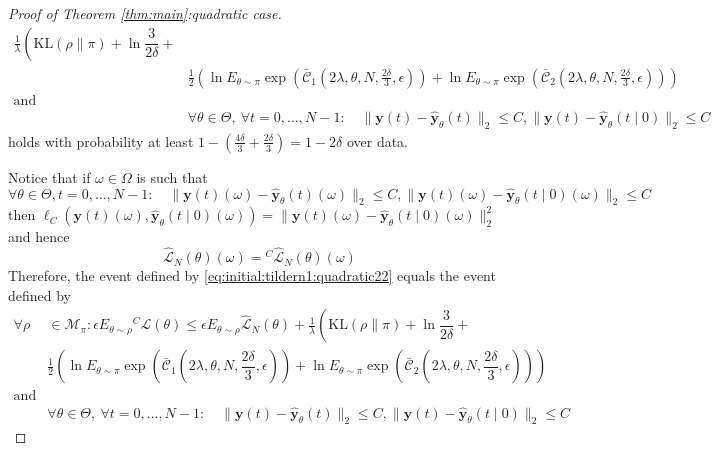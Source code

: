 \documentclass{article}
\newcommand{\KL}{\mathrm{KL}}
\renewcommand{\KL}{\mathrm{KL}}
\newcommand{\y}{\mathbf{y}}
\begin{document}
\begin{proof}[Proof of Theorem \ref{thm:main}:quadratic case]
\begin{equation}
\begin{aligned}
          \frac{1}{\lambda}\left ( \KL(\rho\|\pi) + \ln\dfrac{3}{2\delta} + \right. \\
          &  \left. \frac{1}{2} 
          \left(\ln E_{\theta\sim\pi} \exp(\mathcal{\bar{C}}_1(2\lambda,\theta,N,\frac{2\delta}{3},\epsilon))+
          \ln E_{\theta \sim \pi} \exp(\mathcal{\bar{C}}_2(2\lambda,\theta,N,\frac{2\delta}{3},\epsilon))\right) \right.\\
          \text{and}&\\
          &\forall \theta \in \Theta,~\forall t=0,\ldots,N-1: \quad
          \|\y(t)-\hat{\y}_{\theta}(t)\|_2 \le C, \|\y(t)-\hat{\y}_{\theta}(t \mid 0)\|_2 \le C
    \end{aligned}
    \end{equation}
    holds with probability at least  $1-(\frac{4\delta}{3}+\frac{2\delta}{3}) = 1-2\delta$ over data.

    Notice that if $\omega \in \Omega$ is such that
     \[ \forall \theta \in \Theta, t=0,\ldots,N-1: \quad
          \|\y(t)(\omega)-\hat{\y}_{\theta}(t)(\omega)\|_2 \le C, \|\y(t)(\omega  )-\hat{\y}_{\theta}(t \mid 0)(\omega)\|_2 \le C
    \]
    then $\ell_C(\y(t)(\omega),\hat{\y}_{\theta}(t \mid 0)(\omega)) = \|\y(t)(\omega)-\hat{\y}_{\theta}(t \mid 0)(\omega)\|_2^2$ and hence
    \[ \hat{\mathcal{L}}_N(\theta)(\omega) = {}^C\hat{\mathcal{L}}_N(\theta)(\omega) \]
    Therefore, the event defined by  \eqref{eq:initial:tildern1:quadratic22} equals the event defined by 
     \begin{equation}
        \label{eq:initial:tildern1:quadratic2} 
    \begin{aligned}
         \forall \rho & \in \mathcal{M}_\pi: \epsilon E_{\theta\sim\rho} {}^{C}\mathcal{L}(\theta)
         \leq   \epsilon E_{\theta\sim\rho}{} \hat{\mathcal{L}}_N(\theta) +  
          \frac{1}{\lambda}\left ( \KL(\rho\|\pi) + \ln\dfrac{3}{2\delta} + \right. \\
          &  \left. \frac{1}{2} 
          \left(\ln E_{\theta\sim\pi} \exp(\mathcal{\bar{C}}_1(2\lambda,\theta,N,\dfrac{2\delta}{3},\epsilon))+
          \ln E_{\theta \sim \pi} \exp(\mathcal{\bar{C}}_2(2\lambda,\theta,N,\dfrac{2\delta}{3},\epsilon)) \right)  \right. \\
          \text{and}&\\%
          &\forall \theta \in \Theta,~\forall t=0,\ldots,N-1: \quad
          \|\y(t)-\hat{\y}_{\theta}(t)\|_2 \le C, \|\y(t)-\hat{\y}_{\theta}(t \mid 0)\|_2 \le C
    \end{aligned}
    \end{equation}


\end{proof}
\end{document}
